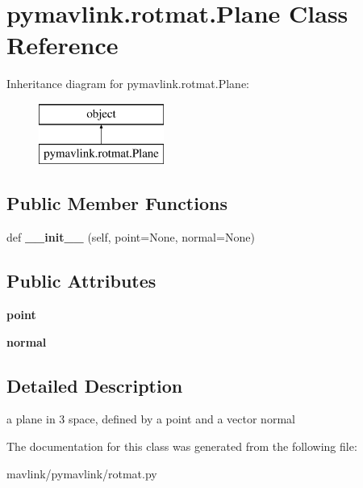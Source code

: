 \hypertarget{classpymavlink_1_1rotmat_1_1Plane}{}\section{pymavlink.\+rotmat.\+Plane Class Reference}
\label{classpymavlink_1_1rotmat_1_1Plane}
Inheritance diagram for pymavlink.\+rotmat.\+Plane\+:\begin{figure}[H]
\begin{center}
\leavevmode
\includegraphics[height=2.000000cm]{classpymavlink_1_1rotmat_1_1Plane}
\end{center}
\end{figure}
\subsection*{Public Member Functions}
\begin{DoxyCompactItemize}
\item 
\mbox{\label{classpymavlink_1_1rotmat_1_1Plane_abb7f1250507e4cc5416009975337e80e}} 
def {\bfseries \+\_\+\+\_\+init\+\_\+\+\_\+} (self, point=None, normal=None)
\end{DoxyCompactItemize}
\subsection*{Public Attributes}
\begin{DoxyCompactItemize}
\item 
\mbox{\label{classpymavlink_1_1rotmat_1_1Plane_aecbe2c0258b7dfa90fe10651aa4b33c1}} 
{\bfseries point}
\item 
\mbox{\label{classpymavlink_1_1rotmat_1_1Plane_ad5fafc28ce87e911182fd5f4cf8f53d1}} 
{\bfseries normal}
\end{DoxyCompactItemize}


\subsection{Detailed Description}
\begin{DoxyVerb}a plane in 3 space, defined by a point and a vector normal\end{DoxyVerb}
 

The documentation for this class was generated from the following file\+:\begin{DoxyCompactItemize}
\item 
mavlink/pymavlink/rotmat.\+py\end{DoxyCompactItemize}
